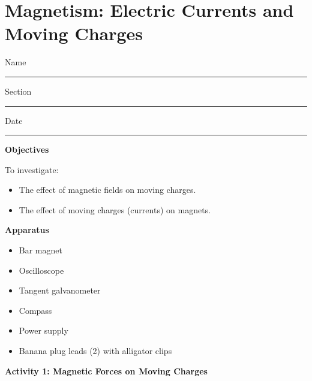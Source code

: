 
\section{Magnetism: Electric Currents and Moving Charges}

Name \rule{2.0in}{0.1pt}\hfill{}Section \rule{1.0in}{0.1pt}\hfill{}Date
\rule{1.0in}{0.1pt}

\textbf{Objectives}

To investigate:

\begin{itemize}
\item The effect of magnetic fields on moving charges. 
\item The effect of moving charges (currents) on magnets. 
\end{itemize}

\textbf{Apparatus} 

\begin{itemize} 
\item Bar magnet
\item Oscilloscope
\item Tangent galvanometer
\item Compass
\item Power supply
\item Banana plug leads (2) with alligator clips
\end{itemize}





\textbf{Activity 1: Magnetic Forces on Moving Charges }

